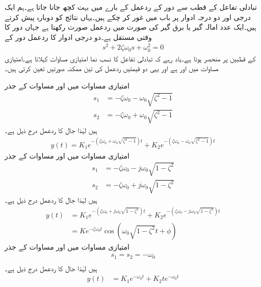 تبادلی تفاعل کے قطب سے دور کے ردعمل کے بارے میں بہت کچھ جانا جاتا ہے۔ہم ایک درجی اور دو درجہ ادوار پر باب  میں غور کر چکے ہیں۔یہاں نتائج کو دوبارہ پیش کرتے ہیں۔ایک عدد امالہ گیر یا برق گیر کی صورت میں ردعمل  صورت رکھتا ہے جہاں  دور کا وقتی مستقل ہے۔دو درجی ادوار کا ردعمل دور کے 
\begin{align*}
s^2+2\zeta \omega_0 s+\omega_0^2=0
\end{align*}
کے قطبین پر منحصر ہوتا ہے۔یاد رہے کہ تبادلی تفاعل کا نسب نما امتیازی مساوات کہلاتا ہے۔امتیازی مساوات میں   اور   ہے اور یہی دو قیمتیں ردعمل کی تین ممکنہ صورتیں تعین کرتی ہیں۔
\begin{description}
 امتیازی مساوات میں  اور مساوات  کے جذر
\begin{align*}
s_1&=-\zeta\omega_0-\omega_0\sqrt{\zeta^2-1}\\
s_2&=-\zeta\omega_0+\omega_0\sqrt{\zeta^2-1}
\end{align*}
ہیں لہٰذا جال کا ردعمل درج ذیل ہے۔
\begin{align*}
y(t)=K_1e^{-(\zeta\omega_0+\omega_0\sqrt{\zeta^2-1})t}+K_2e^{-(\zeta\omega_0-\omega_0\sqrt{\zeta^2-1})t}
\end{align*}
 امتیازی مساوات میں  اور مساوات  کے جذر
\begin{align*}
s_1&=-\zeta\omega_0-j\omega_0\sqrt{1-\zeta^2}\\
s_2&=-\zeta\omega_0+j\omega_0\sqrt{1-\zeta^2}
\end{align*}
ہیں لہٰذا جال کا ردعمل درج ذیل ہے۔
\begin{align*}
y(t)&=K_1e^{-(\zeta\omega_0+j\omega_0\sqrt{1-\zeta^2})t}+K_2e^{-(\zeta\omega_0-j\omega_0\sqrt{1-\zeta^2})t}\\
&=Ke^{-\zeta \omega_0 t} \cos (\omega_0\sqrt{1-\zeta^2} t+\phi)
\end{align*}
 امتیازی مساوات میں  اور مساوات  کے جذر
\begin{align*}
s_1=s_2=-\omega_0\\
\end{align*}
ہیں لہٰذا جال کا ردعمل درج ذیل ہے۔
\begin{align*}
y(t)&=K_1e^{-\omega_0 t}+K_2 te^{-\omega_0 t}
\end{align*}
\end{description}

